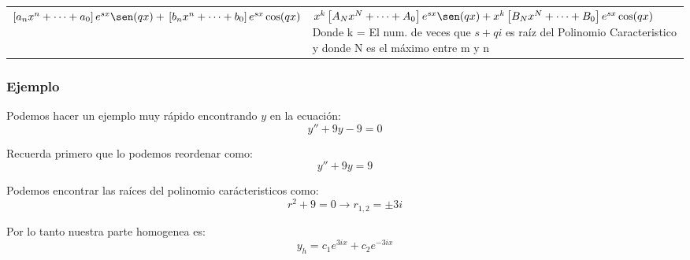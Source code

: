 \documentclass[12pt]{report}                                %
\begin{document}
\begin{longtable}{p{70mm} || p{90mm}}
         
            $\left[a_nx^n+\cdots+a_0\right]e^{sx}\sen(qx) +                                         \newline
            \left[b_nx^n+\cdots+b_0\right]e^{sx}\cos(qx)$                                           &

            $x^k \left[A_Nx^N+\cdots+A_0\right]e^{sx}\sen(qx) +                                     \newline
             x^k \left[B_Nx^N+\cdots+B_0\right]e^{sx}\cos(qx) $                                     \newline
            \tiny                                                                                   \newline
            \footnotesize Donde k = El num. de veces que $s+qi$ es raíz del
            Polinomio Caracteristico y donde N es el máximo entre m y n                             \\ [6.0ex]
         
        \end{longtable}


        \clearpage
        \subsubsection{Ejemplo}
            Podemos hacer un ejemplo muy rápido encontrando $y$ en la ecuación:
            \begin{equation*}
                y'' + 9y -9 = 0
            \end{equation*}
            
            Recuerda primero que lo podemos reordenar como:
            \begin{equation*}
                y'' +9y = 9
            \end{equation*}

            Podemos encontrar las raíces del polinomio carácteristicos como:
            \begin{equation*}
                r^2 + 9 = 0 \to r_{1,2} = \pm 3i
            \end{equation*}

            Por lo tanto nuestra parte homogenea es:
            \begin{equation*}
                y_h = c_1 e^{3ix} + c_2 e^{-3ix} 
            \end{equation*}
\end{document}
